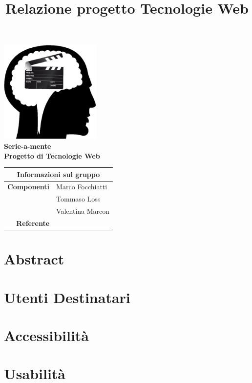 \documentclass{tecweb}
\title{Relazione progetto Tecnologie Web}
\begin{document}
	\begin{titlepage}
		\begin{center}
			\includegraphics[width=5cm]{Logo2}
			\vspace{0.5cm}	\\
			\Huge \textbf{Serie-a-mente}
			\vspace{0.5cm}\\
			\normalsize \textbf{Progetto di Tecnologie Web}
			\vspace{0.7cm}	\\
			\renewcommand\arraystretch{1.3}	
			\begin{tabularx}{11cm}{r|X}
				\multicolumn{2}{c}{\textbf{Informazioni sul gruppo}}\\ 
				\hline
				\textbf{Componenti} & Marco Focchiatti \\ & Tommaso Loss \\ & Valentina Marcon \\  
				\textbf{Referente}  
			\end{tabularx}
		\end{center}
	\end{titlepage}

	\section{Abstract}

	\section{Utenti Destinatari}
	
	\section{Accessibilità}

	\section{Usabilità}
	
\end{document}
